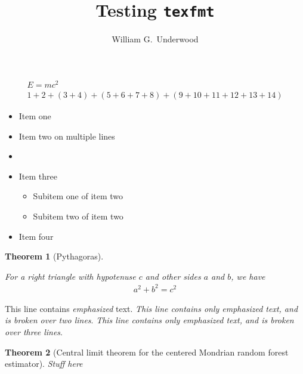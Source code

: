 \documentclass{article}
\title{Testing \texttt{texfmt}}
\author{William G.\ Underwood}
\newtheorem{theorem}{Theorem}
\begin{document}
\maketitle

\begin{align}
  E = m c^2 \\
  1 + 2
  + (3 + 4)
  + (5 + 6
  + 7 + 8)
  + (9 + 10
    + 11 + 12
  + 13 + 14)
\end{align}

\begin{itemize}
  \item Item one %
  \item Item two on
    multiple lines
  \item
  \item Item three
    \begin{itemize}
      \item Subitem one of item two
      \item Subitem two of item two
    \end{itemize}
  \item Item four %
\end{itemize}

\begin{theorem}[Pythagoras]%
  \label{thm:pythagoras}

  For a right triangle with hypotenuse $c$ and other sides $a$ and $b$,
  we have
  \begin{align*}
    a^2 + b^2 = c^2
  \end{align*}

\end{theorem}

This line contains \emph{emphasized} text.
\emph{This line contains only emphasized text,
and is broken over two lines}.
\emph{This line contains only
  emphasized text,
and is broken over three lines}.

\begin{theorem}[Central limit theorem for the centered
  Mondrian random forest estimator]%
  \label{thm:clt}
  Stuff here
\end{theorem}
\end{document}
